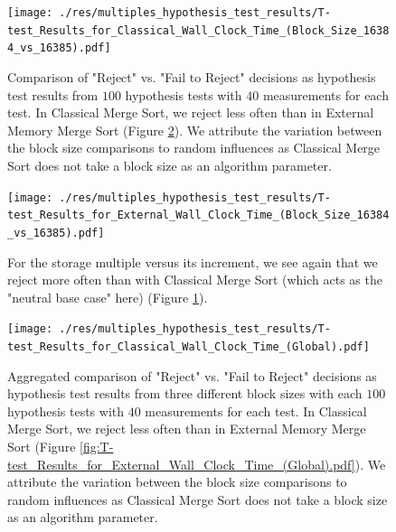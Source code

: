 \documentclass[twocolumn]{article}
\begin{document}
\begin{figure}[htb]
    \begin{minipage}{0.475 \textwidth}
        \centering
        \texttt{[image: ./res/multiples\_hypothesis\_test\_results/T-test\_Results\_for\_Classical\_Wall\_Clock\_Time\_(Block\_Size\_16384\_vs\_16385).pdf]}
        \caption{Comparison of "Reject" vs. "Fail to Reject" decisions as hypothesis test results from \( 100 \) hypothesis tests with \( 40 \) measurements for each test.
            In Classical Merge Sort, we reject less often than in External Memory Merge Sort (Figure \ref{fig:T-test_Results_for_External_Wall_Clock_Time_(Block_Size_16384_vs_16385).pdf}).
            We attribute the variation between the block size comparisons to random influences as Classical Merge Sort does not take a block size as an algorithm parameter.}
        \label{fig:T-test_Results_for_Classical_Wall_Clock_Time_(Block_Size_16384_vs_16385).pdf}
    \end{minipage}
\end{figure}

\begin{figure}[htb]
    \begin{minipage}{0.475 \textwidth}
        \centering
        \texttt{[image: ./res/multiples\_hypothesis\_test\_results/T-test\_Results\_for\_External\_Wall\_Clock\_Time\_(Block\_Size\_16384\_vs\_16385).pdf]}
        \caption{For the storage multiple versus its increment, we see again that we reject more often than with Classical Merge Sort (which acts as the "neutral base case" here) (Figure \ref{fig:T-test_Results_for_Classical_Wall_Clock_Time_(Block_Size_16384_vs_16385).pdf}).}
        \label{fig:T-test_Results_for_External_Wall_Clock_Time_(Block_Size_16384_vs_16385).pdf}
    \end{minipage}
\end{figure}

\begin{figure}[htb]
    \begin{minipage}{0.475 \textwidth}
        \centering
        \texttt{[image: ./res/multiples\_hypothesis\_test\_results/T-test\_Results\_for\_Classical\_Wall\_Clock\_Time\_(Global).pdf]}
        \caption{Aggregated comparison of "Reject" vs. "Fail to Reject" decisions as hypothesis test results from three different block sizes with each \( 100 \) hypothesis tests with \( 40 \) measurements for each test. In Classical Merge Sort, we reject less often than in External Memory Merge Sort (Figure \ref{fig:T-test_Results_for_External_Wall_Clock_Time_(Global).pdf}).
            We attribute the variation between the block size comparisons to random influences as Classical Merge Sort does not take a block size as an algorithm parameter.}
        \label{fig:T-test_Results_for_Classical_Wall_Clock_Time_(Global).pdf}
    \end{minipage}
\end{figure}
\end{document}
